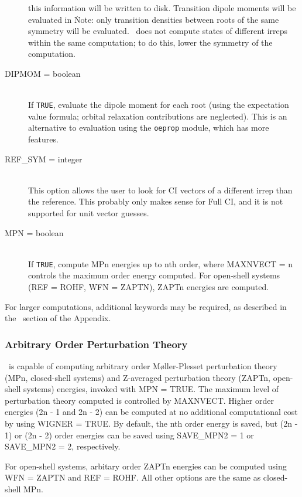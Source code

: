 \begin{description}
this information will be written to disk.  Transition dipole moments
will be evaluated in \PSIdetci\.  Note: only transition densities
between roots of the same symmetry will be evaluated.  \PSIdetci\ does not
compute states of different irreps within the same computation; to do this,
lower the symmetry of the computation.
\item[DIPMOM = boolean]\mbox{}\\
If {\tt TRUE}, evaluate the dipole moment for each root (using the expectation
value formula; orbital relaxation contributions are neglected).  This is
an alternative to evaluation using the {\tt oeprop} module, which has
more features.
\item[REF\_SYM = integer]\mbox{}\\
This option allows the user to look for CI vectors of a different irrep
than the reference.  This probably only makes sense for Full CI,
and it is not supported for unit vector guesses.
\item[MPN = boolean]\mbox{}\\
If {\tt TRUE}, compute MPn energies up to nth order, where MAXNVECT = n
controls the maximum order energy computed.  For open-shell systems
(REF = ROHF, WFN = ZAPTN), ZAPTn energies are computed.
\end{description}

For larger computations, additional keywords may be required, as
described in the \PSIdetci\ section of the Appendix.

\subsubsection{Arbitrary Order Perturbation Theory}
\PSIfour\ is capable of computing arbitrary order M{\o}ller-Plesset
 perturbation theory (MPn, closed-shell systems) and
Z-averaged perturbation theory (ZAPTn, open-shell systems) energies,
invoked with MPN = TRUE.  The maximum level of perturbation theory
computed is controlled by MAXNVECT.  Higher order energies (2n -
1 and 2n - 2) can be computed at no additional computational cost by
using WIGNER = TRUE.  By default, the n{th} order energy is saved, but
(2n - 1) or (2n - 2) order energies can be saved using SAVE\_MPN2 =
1 or SAVE\_MPN2 = 2, respectively.

For open-shell systems, arbitary order ZAPTn energies can be computed
using WFN = ZAPTN and REF = ROHF.  All other options are the same as
closed-shell MPn.
